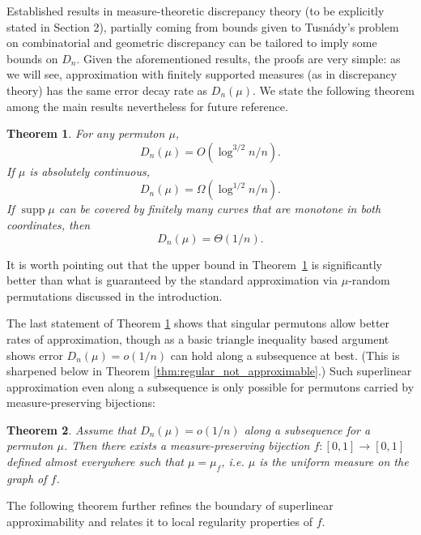 \documentclass{article}
\newcommand{\supp}{\mathop{\mathrm{supp}}}
\newtheorem{theorem}{Theorem}[section]
\theoremstyle{definition}
\begin{document}
Established results in measure-theoretic discrepancy theory \cite{Chen1985, Aistleitner2018} (to be explicitly stated in Section 2), partially coming from bounds given to Tusnády's problem on combinatorial and geometric discrepancy \cite{Nikolov2017} can be tailored to imply some bounds on $D_n$. Given the aforementioned results, the proofs are very simple: as we will see, approximation with finitely supported measures (as in discrepancy theory) has the same error decay rate as $D_n(\mu)$. We state the following theorem among the main results nevertheless for future reference.

\begin{theorem} \label{thm:universal_approximability}
    For any permuton $\mu$,
    $$D_n(\mu)=O(\log^{3/2} n/n).$$
    If $\mu$ is absolutely continuous,
    $$D_n(\mu)=\Omega(\log^{1/2} n/n).$$
    If $\supp \mu$ can be covered by finitely many curves that are monotone in both coordinates, then
    $$D_n(\mu)=\Theta(1/n).$$
\end{theorem}

It is worth pointing out that the upper bound in Theorem~\ref{thm:universal_approximability} is significantly better than what is guaranteed by the standard approximation via $\mu$-random permutations discussed in the introduction.

The last statement of Theorem \ref{thm:universal_approximability} shows that singular permutons allow better rates of approximation, though as a basic triangle inequality based argument shows error $D_n(\mu)=o(1/n)$ can hold along a subsequence at best. (This is sharpened below in Theorem \ref{thm:regular_not_approximable}.) Such superlinear approximation even along a subsequence is only possible for permutons carried by measure-preserving bijections:

\begin{theorem}\label{thm:only_bijections_are_well_approximable}
    Assume that $D_n(\mu)=o(1/n)$ along a subsequence for a permuton $\mu$. Then there exists a measure-preserving bijection $f:[0,1]\to[0, 1]$ defined almost everywhere such that $\mu=\mu_f$, i.e. $\mu$ is the uniform measure on the graph of $f$.
\end{theorem}


The following theorem further refines the boundary of superlinear approximability and relates it to local regularity properties of $f$.
\end{document}
